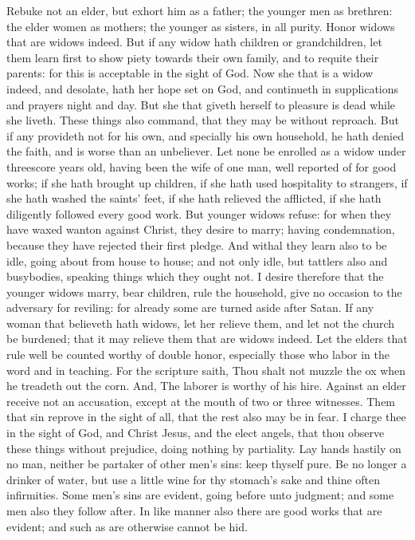 Rebuke not an elder, but exhort him as a father; the younger men as brethren: the elder women as mothers; the younger as sisters, in all purity. Honor widows that are widows indeed. But if any widow hath children or grandchildren, let them learn first to show piety towards their own family, and to requite their parents: for this is acceptable in the sight of God. Now she that is a widow indeed, and desolate, hath her hope set on God, and continueth in supplications and prayers night and day. But she that giveth herself to pleasure is dead while she liveth. These things also command, that they may be without reproach. But if any provideth not for his own, and specially his own household, he hath denied the faith, and is worse than an unbeliever. Let none be enrolled as a widow under threescore years old, having been the wife of one man, well reported of for good works; if she hath brought up children, if she hath used hospitality to strangers, if she hath washed the saints’ feet, if she hath relieved the afflicted, if she hath diligently followed every good work. But younger widows refuse: for when they have waxed wanton against Christ, they desire to marry; having condemnation, because they have rejected their first pledge. And withal they learn also to be idle, going about from house to house; and not only idle, but tattlers also and busybodies, speaking things which they ought not. I desire therefore that the younger widows marry, bear children, rule the household, give no occasion to the adversary for reviling: for already some are turned aside after Satan. If any woman that believeth hath widows, let her relieve them, and let not the church be burdened; that it may relieve them that are widows indeed.  Let the elders that rule well be counted worthy of double honor, especially those who labor in the word and in teaching. For the scripture saith, Thou shalt not muzzle the ox when he treadeth out the corn. And, The laborer is worthy of his hire. Against an elder receive not an accusation, except at the mouth of two or three witnesses. Them that sin reprove in the sight of all, that the rest also may be in fear. I charge thee in the sight of God, and Christ Jesus, and the elect angels, that thou observe these things without prejudice, doing nothing by partiality. Lay hands hastily on no man, neither be partaker of other men’s sins: keep thyself pure. Be no longer a drinker of water, but use a little wine for thy stomach’s sake and thine often infirmities. Some men’s sins are evident, going before unto judgment; and some men also they follow after. In like manner also there are good works that are evident; and such as are otherwise cannot be hid. 

